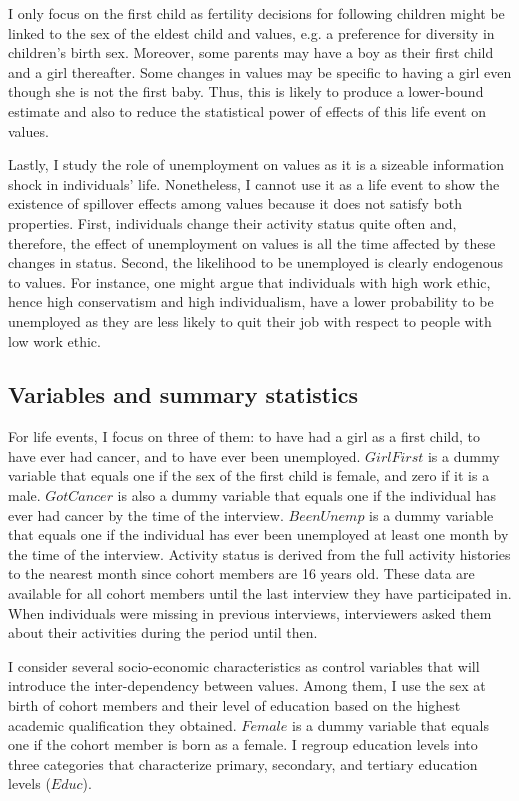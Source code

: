 %
I only focus on the first child as fertility decisions for following children might be linked to the sex of the eldest child and values, e.g. a preference for diversity in children's birth sex. Moreover, some parents may have a boy as their first child and a girl thereafter. Some changes in values may be specific to having a girl even though she is not the first baby. Thus, this is likely to produce a lower-bound estimate and also to reduce the statistical power of effects of this life event on values.

Lastly, I study the role of unemployment on values as it is a sizeable information shock in individuals' life. Nonetheless, I cannot use it as a life event to show the existence of spillover effects among values because it does not satisfy both properties. First, individuals change their activity status quite often and, therefore, the effect of unemployment on values is all the time affected by these changes in status. Second, the likelihood to be unemployed is clearly endogenous to values. For instance, one might argue that individuals with high work ethic, hence high conservatism and high individualism, have a lower probability to be unemployed as they are less likely to quit their job with respect to people with low work ethic.

\subsection{Variables and summary statistics}

For life events, I focus on three of them: to have had a girl as a first child, to have ever had cancer, and to have ever been unemployed. $GirlFirst$ is a dummy variable that equals one if the sex of the first child is female, and zero if it is a male. $GotCancer$ is also a dummy variable that equals one if the individual has ever had cancer by the time of the interview. $BeenUnemp$ is a dummy variable that equals one if the individual has ever been unemployed at least one month by the time of the interview. 
Activity status is derived from the full activity histories to the nearest month since cohort members are 16 years old. These data are available for all cohort members until the last interview they have participated in. When individuals were missing in previous interviews, interviewers asked them about their activities during the period until then.

I consider several socio-economic characteristics as control variables that will introduce the inter-dependency between values. Among them, I use the sex at birth of cohort members and their level of education based on the highest academic qualification they obtained. $Female$ is a dummy variable that equals one if the cohort member is born as a female. I regroup education levels into three categories that characterize primary, secondary, and tertiary education levels ($Educ$). 

